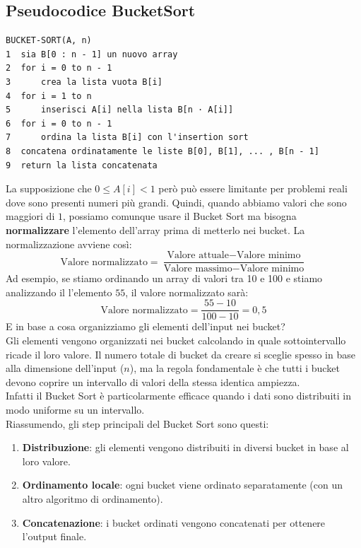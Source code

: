 \subsection{Pseudocodice BucketSort}
\begin{verbatim}
BUCKET-SORT(A, n)
1  sia B[0 : n - 1] un nuovo array
2  for i = 0 to n - 1
3      crea la lista vuota B[i]
4  for i = 1 to n
5      inserisci A[i] nella lista B[n · A[i]]
6  for i = 0 to n - 1
7      ordina la lista B[i] con l'insertion sort
8  concatena ordinatamente le liste B[0], B[1], ... , B[n - 1]
9  return la lista concatenata
\end{verbatim}
La supposizione che $0\le A[i] <1$ però può essere limitante per problemi reali dove sono presenti numeri più grandi. Quindi, quando abbiamo valori che sono maggiori di $1$, possiamo comunque usare il Bucket Sort ma bisogna \textbf{normalizzare} l'elemento dell'array prima di metterlo nei bucket. La normalizzazione avviene così:
$$\text{Valore normalizzato} = \frac{\text{Valore attuale} - \text{Valore minimo}}{\text{Valore massimo}- \text{Valore minimo} }$$
Ad esempio, se stiamo ordinando un array di valori tra 10 e 100 e stiamo analizzando il l'elemento $55$, il valore normalizzato sarà:
$$ \text{Valore normalizzato} = \frac{55-10}{100-10} = 0,5$$
E in base a cosa organizziamo gli elementi dell'input nei bucket?\\
Gli elementi vengono organizzati nei bucket calcolando in quale sottointervallo ricade il loro valore. Il numero totale di bucket da creare si sceglie spesso in base alla dimensione dell'input ($n$), ma la regola fondamentale è che tutti i bucket devono coprire un intervallo di valori della stessa identica ampiezza.\\
Infatti il Bucket Sort è particolarmente efficace quando i dati sono distribuiti in modo uniforme su un intervallo.\smallskip\\
Riassumendo, gli step principali del Bucket Sort sono questi:
\begin{enumerate}
    \item \textbf{Distribuzione}: gli elementi vengono distribuiti in diversi bucket in base al loro valore.
    \item \textbf{Ordinamento locale}: ogni bucket viene ordinato separatamente (con un altro algoritmo di ordinamento).
    \item \textbf{Concatenazione}: i bucket ordinati vengono concatenati per ottenere l'output finale.
\end{enumerate}

